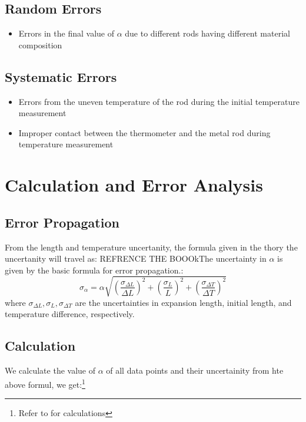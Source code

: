 \documentclass[%
 sor,
 jor,
 amsmath,amssymb,
 reprint,
]{revtex4-2}
\begin{document}
\subsection{Random Errors}
\begin{itemize}
	\item Errors in the final value of $\alpha$ due to different rods having different material composition 
\end{itemize}
\subsection{Systematic Errors}
\begin{itemize}
	\item Errors from the uneven temperature of the rod during the initial temperature measurement
	\item Improper contact between the thermometer and the metal rod during temperature measurement
\end{itemize}



\section{Calculation and Error Analysis}
\subsection{Error Propagation}
From the length and temperature uncertanity, the formula given in the thory the uncertanity will travel as: REFRENCE THE BOOOkThe uncertainty in $\alpha$ is given by the basic formula for error propagation.:
\[
\sigma_{\alpha} = \alpha \sqrt{\left( \frac{\sigma_{\Delta L}}{\Delta L} \right)^2 + \left( \frac{\sigma_L}{L} \right)^2 + \left( \frac{\sigma_{\Delta T}}{\Delta T} \right)^2}
\]
where $\sigma_{\Delta L}, \sigma_L, \sigma_{\Delta T}$ are the uncertainties in expansion length, initial length, and temperature difference, respectively.

\subsection{Calculation}
We calculate the value of $\alpha$ of all data points and their uncertainity from hte above formul,  we get:\footnote{Refer to \cite{github} for calculations}
\end{document}
